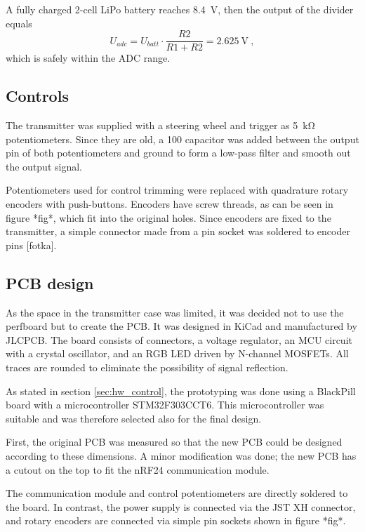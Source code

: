 A fully charged 2-cell LiPo battery reaches \SI{8.4}{\V}, then the output of the divider equals
\begin{equation}
	U_{adc} = U_{batt} \cdot \frac{R2}{R1+R2} = \SI{2.625}{\V}\ ,
\end{equation}
which is safely within the ADC range.

\subsection{Controls}
The transmitter was supplied with a steering wheel and trigger as \SI{5}{\kohm} potentiometers. Since they are old, a \SI{100}{\nF} capacitor was added between the output pin of both potentiometers and ground to form a low-pass filter and smooth out the output signal.

Potentiometers used for control trimming were replaced with quadrature rotary encoders with push-buttons. Encoders have screw threads, as can be seen in figure *fig*, which fit into the original holes. Since encoders are fixed to the transmitter, a simple connector made from a pin socket was soldered to encoder pins [\todo fotka].

\subsection{PCB design}
As the space in the transmitter case was limited, it was decided not to use the perfboard but to create the PCB. It was designed in KiCad and manufactured by JLCPCB. The board consists of connectors, a voltage regulator, an MCU circuit with a crystal oscillator, and an RGB LED driven by N-channel MOSFETs. All traces are rounded to eliminate the possibility of signal reflection.

As stated in section \ref{sec:hw_control}, the prototyping was done using a BlackPill board with a microcontroller STM32F303CCT6. This microcontroller was suitable and was therefore selected also for the final design.

First, the original PCB was measured so that the new PCB could be designed according to these dimensions. A minor modification was done; the new PCB has a cutout on the top to fit the nRF24 communication module.

The communication module and control potentiometers are directly soldered to the board. In contrast, the power supply is connected via the JST XH connector, and rotary encoders are connected via simple pin sockets shown in figure *fig*.

